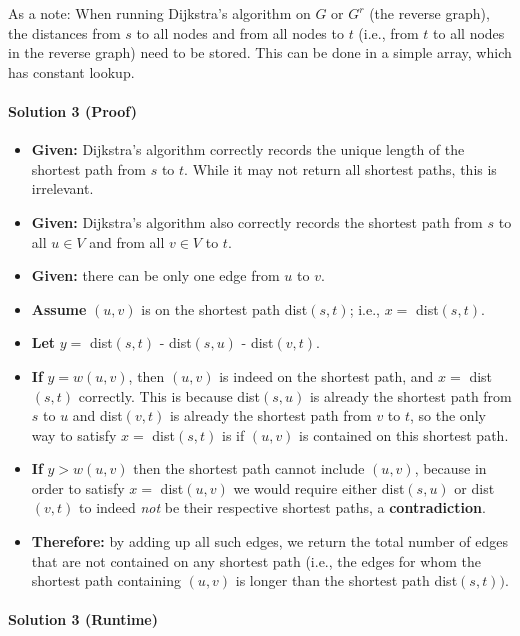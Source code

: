 \documentclass[11pt]{article}
\begin{document}
As a note: When running Dijkstra's algorithm on $G$ or $G^r$ (the reverse graph), the distances from $s$ to all nodes and from all nodes to $t$ (i.e., from $t$ to all nodes in the reverse graph) need to be stored. This can be done in a simple array, which has constant lookup.

\paragraph{Solution 3 (Proof)}

\begin{itemize}
    \item \textbf{Given:} Dijkstra's algorithm correctly records the unique length of the shortest path from $s$ to $t$. While it may not return all shortest paths, this is irrelevant.
    \item \textbf{Given:} Dijkstra's algorithm also correctly records the shortest path from $s$ to all $u \in V$ and from all $v \in V$ to $t$.
    \item \textbf{Given:} there can be only one edge from $u$ to $v$.
    \item \textbf{Assume} $(u, v)$ is on the shortest path dist$(s, t)$; i.e., $x =$ dist$(s, t)$.
    \item \textbf{Let} $y =$ dist$(s, t)$ - dist$(s, u)$ - dist$(v, t)$.
    \item \textbf{If} $y = w(u, v)$, then $(u, v)$ is indeed on the shortest path, and $x =$ dist$(s, t)$ correctly. This is because dist$(s, u)$ is already the shortest path from $s$ to $u$ and dist$(v, t)$ is already the shortest path from $v$ to $t$, so the only way to satisfy $x =$ dist$(s, t)$ is if $(u, v)$ is contained on this shortest path.
    \item \textbf{If} $y > w(u, v)$ then the shortest path cannot include $(u, v)$, because in order to satisfy $x =$ dist$(u, v)$ we would require either dist$(s, u)$ or dist$(v, t)$ to indeed \textit{not} be their respective shortest paths, a \textbf{contradiction}.
    \item \textbf{Therefore:} by adding up all such edges, we return the total number of edges that are not contained on any shortest path (i.e., the edges for whom the shortest path containing $(u, v)$ is longer than the shortest path dist$(s, t))$.
\end{itemize}

\paragraph{Solution 3 (Runtime)}
\end{document}
